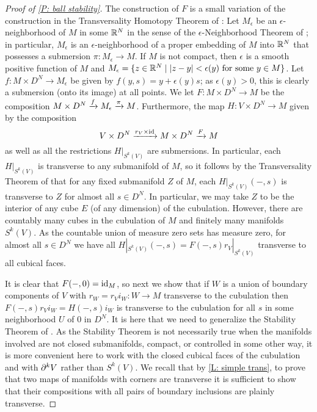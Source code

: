 \begin{proof}[Proof of \cref{P: ball stability}]
	The construction of $F$ is a small variation of the construction in the Transversality Homotopy Theorem of \cite[Section 2.3]{GuPo74}:
	Let $M_\epsilon$ be an $\epsilon$-neighborhood of $M$ in some $\mathbb{R}^N$ in the sense of the $\epsilon$-Neighborhood Theorem of \cite[Section 2.3]{GuPo74}; in particular,
	$M_\epsilon$ is an $\epsilon$-neighborhood of a proper embedding of $M$ into $\mathbb{R}^N$ that possesses a submersion $\pi \colon M_\epsilon \to M$.
	If $M$ is not compact, then $\epsilon$ is a smooth positive function of $M$ and $M_\epsilon = \{z \in \mathbb{R}^N \mid |z-y|<\epsilon(y) \text{ for some }y \in M\}$.
	Let $f \colon M \times D^N \to M_\epsilon$ be given by $f(y, s) = y + \epsilon(y) s$; as $\epsilon(y)>0$, this is clearly a submersion (onto its image) at all points.
	We let $F \colon M \times D^N \to M$ be the composition $M \times D^N \xrightarrow{f}M_\epsilon \xrightarrow{\pi}M$.
	Furthermore, the map $H \colon V \times D^N \to M$ given by the composition $$V \times D^N \xrightarrow{r_V \times \mathrm{id}} M \times D^N \xrightarrow{F} M$$ as well as all the restrictions $H|_{S^k(V)}$
	are submersions.
	In particular, each $H|_{S^k(V)}$ is transverse to any submanifold of $M$, so it follows by the Transversality Theorem of \cite[Section 2.3]{GuPo74} that for any fixed submanifold $Z$ of $M$, each $H|_{S^k(V)}(-,s)$ is transverse to $Z$ for almost all $s \in D^N$.
	In particular, we may take $Z$ to be the interior of any cube $E$ (of any dimension) of the cubulation.
	However, there are countably many cubes in the cubulation of $M$ and finitely many manifolds $S^k(V)$.
	As the countable union of measure zero sets has measure zero, for almost all $s \in D^N$ we have all $H|_{S^k(V)}(-,s) = F(-,s)r_V|_{S^k(V)}$ transverse to all cubical faces.

	It is clear that $F(-,0) = \mathrm{id}_M$, so next we show that if $W$ is a union of boundary components of $V$ with $r_W = r_Vi_W \colon W \to M$ transverse to the cubulation then $F(-,s)r_Vi_W = H(-,s)i_W$ is transverse to the cubulation for all $s$ in some neighborhood $U$ of $0$ in $D^N$.
	It is here that we need to generalize the Stability Theorem of \cite[Section 1.6]{GuPo74}.
	As the Stability Theorem is not necessarily true when the manifolds involved are not closed submanifolds, compact, or controlled in some other way, it is more convenient here to work with the closed cubical faces of the cubulation and with $\partial^kV$ rather than $S^k(V)$.
	We recall that by \cref{L: simple trans}, to prove that two maps of manifolds with corners are transverse it is sufficient to show that their compositions with all pairs of boundary inclusions are plainly transverse.


\end{proof}
